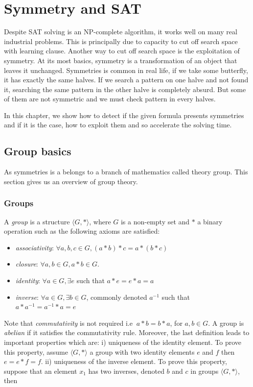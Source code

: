 \chapter{Symmetry and SAT}\label{chap:symmetryinsat}
\minitoc

Despite SAT solving is an NP-complete algorithm, it works well on many real industrial problems. This is 
principally due to capacity to cut off search space with learning clause. Another way to cut off search space is the exploitation of symmetry.
At its most basics, symmetry is a transformation of an object that leaves it unchanged. 
Symmetries is common in real life, if we take some butterfly, it has exactly the same halves.
If we search a pattern on one halve and not found it, searching the same pattern in the other halve is 
completely absurd. But some of them are not symmetric and we must check pattern in every halves.

In this chapter, we show how to detect if the given formula presents symmetries and if it is the case, how to
exploit them and so accelerate the solving time.





\section{Group basics}
As symmetries is a belongs to a branch of mathematics called theory group.
This section gives us an overview of group theory.

\subsection{Groups}
A \emph{group} is a structure $\langle G, * \rangle$, where $G$ is a non-empty set and $*$ a binary
operation such as the following axioms are satisfied:
\begin{itemize}[noitemsep,nolistsep]
 \item \emph{associativity}: $\forall a, b, c \in G, (a * b) * c = a * (b * c)$
 \item \emph{closure}: $\forall a, b \in G, a * b \in G$.
 \item \emph{identity}: $\forall a \in G, \exists e$ such that $ a * e = e * a = a$
 \item \emph{inverse}:  $\forall a \in G, \exists b \in G$, commonly denoted $a^{-1}$ such that
 $a * a^{-1} = a^{-1} * a = e$
\end{itemize}
Note that \emph{commutativity} is not required i.e $\ a * b = b * a$, for $a, b \in G$.
A group is \emph{abelian} if it satisfies the commutativity rule.
Moreover, the last definition leads to important properties which are: i) uniqueness of the identity element. 
To prove this property, assume $\langle G, * \rangle$ a group with two identity elements $e$ and $f$ 
then $ e = e * f = f$.
ii) uniqueness of the inverse element. To prove this property, suppose that an element $x_1$ has two inverses,
denoted $b$ and $c$ in groups $\langle G, * \rangle$, then\\

